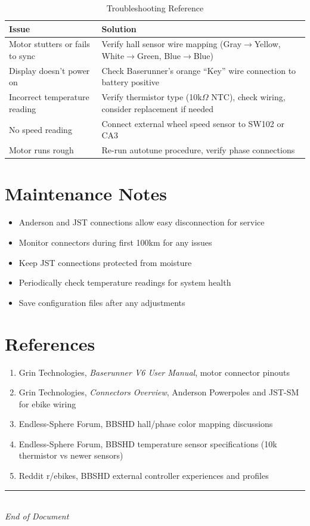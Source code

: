\documentclass[11pt,a4paper]{article}
\begin{document}
\begin{table}[H]
\centering
\caption{Troubleshooting Reference}
\begin{tabular}{p{4cm}p{9cm}}
\toprule
\textbf{Issue} & \textbf{Solution} \\
\midrule
Motor stutters or fails to sync & Verify hall sensor wire mapping (Gray$\rightarrow$Yellow, White$\rightarrow$Green, Blue$\rightarrow$Blue) \\
\midrule
Display doesn't power on & Check Baserunner's orange ``Key'' wire connection to battery positive \\
\midrule
Incorrect temperature reading & Verify thermistor type (10k$\Omega$ NTC), check wiring, consider replacement if needed \\
\midrule
No speed reading & Connect external wheel speed sensor to SW102 or CA3 \\
\midrule
Motor runs rough & Re-run autotune procedure, verify phase connections \\
\bottomrule
\end{tabular}
\end{table}

\section{Maintenance Notes}

\begin{itemize}
    \item Anderson and JST connections allow easy disconnection for service
    \item Monitor connectors during first 100km for any issues
    \item Keep JST connections protected from moisture
    \item Periodically check temperature readings for system health
    \item Save configuration files after any adjustments
\end{itemize}

\section{References}

\begin{enumerate}
    \item Grin Technologies, \textit{Baserunner V6 User Manual}, motor connector pinouts
    \item Grin Technologies, \textit{Connectors Overview}, Anderson Powerpoles and JST-SM for ebike wiring
    \item Endless-Sphere Forum, BBSHD hall/phase color mapping discussions
    \item Endless-Sphere Forum, BBSHD temperature sensor specifications (10k thermistor vs newer sensors)
    \item Reddit r/ebikes, BBSHD external controller experiences and profiles
\end{enumerate}

\vspace{1cm}
\begin{center}
\rule{0.5\textwidth}{0.4pt}\\[0.5cm]
\textit{End of Document}
\end{center}
\end{document}
